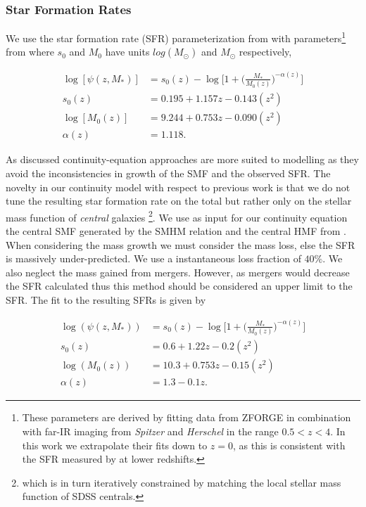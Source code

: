 \subsubsection{Star Formation Rates}
We use the star formation rate (SFR) parameterization from \citet{Lee2015A1.3} with parameters\footnote{These parameters are derived by fitting data from ZFORGE in combination with far-IR imaging from \textit{Spitzer} and \textit{Herschel} in the range $0.5<z<4$. In this work we extrapolate their fits down to $z = 0$, as this is consistent with the SFR measured by  \cite{Salim2007UVUniverse} at lower redshifts.} from \citet{Tomczak2016THE4} where $s_0$ and $M_0$ have units $log(M_{\odot})$ and $M_{\odot}$ respectively,

\begin{equation}
\begin{split}
\label{eqn:SFR}
\log[\psi(z, M_*)] &= s_0(z) - \log \Big[ 1 + \Big(\frac{M_*}{M_0(z)}\Big)^{-\alpha(z)}\Big] \\
s_0(z) &= 0.195 + 1.157z - 0.143(z^2) \\
\log[M_0(z)] &= 9.244 + 0.753z - 0.090(z^2) \\
\alpha(z) &= 1.118.
\end{split}
\end{equation}

As discussed continuity-equation approaches are more suited to modelling as they avoid the inconsistencies in growth of the SMF and the observed SFR. The novelty in our continuity model with respect to previous work is that we do not tune the resulting star formation rate on the total but rather only on the stellar mass function of \textit{central} galaxies \footnote{ which is in turn iteratively constrained by matching the local stellar mass function of SDSS centrals.}. We use as input for our continuity equation the central SMF generated by the SMHM relation and the central HMF from \cite{Tinker2010THETESTS}. When considering the mass growth we must consider the mass loss, else the SFR is massively under-predicted. We use a instantaneous loss fraction of $40\%$. We also neglect the mass gained from mergers. However, as mergers would decrease the SFR calculated thus this method should be considered an upper limit to the SFR. The fit to the resulting SFRs is given by

\begin{equation}
\begin{split}
\label{eqn:SFR_CE}
\log(\psi(z, M_*)) &= s_0(z) - \log \Big[ 1 + \Big(\frac{M_*}{M_0(z)}\Big)^{-\alpha(z)}\Big] \\
s_0(z) &= 0.6 + 1.22z - 0.2(z^2) \\
\log(M_0(z)) &= 10.3 + 0.753z - 0.15(z^2) \\
\alpha(z) &= 1.3 - 0.1z.
\end{split}
\end{equation}

